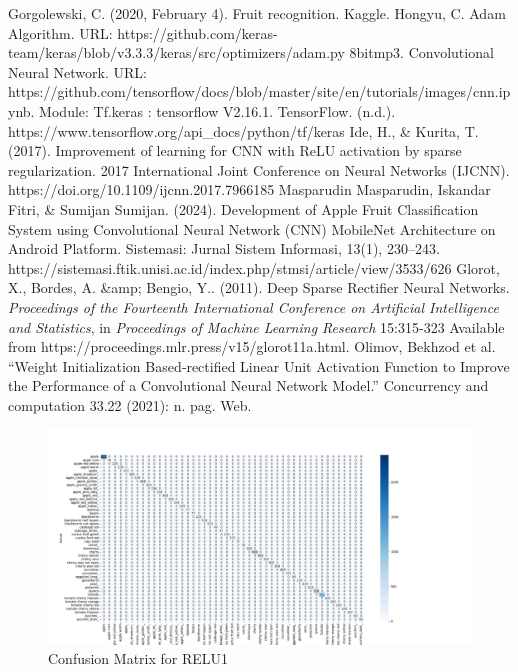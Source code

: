 \documentclass[conference]{IEEEtran}
\begin{document}
\begin{thebibliography}{00}

 Gorgolewski, C. (2020, February 4). Fruit recognition. Kaggle.
 Hongyu, C. Adam Algorithm. URL: https://github.com/keras-team/keras/blob/v3.3.3/keras/src/optimizers/adam.py
 8bitmp3. Convolutional Neural Network. URL: https://github.com/tensorflow/docs/blob/master/site/en/tutorials/images/cnn.ipynb.
 Module: Tf.keras  :  tensorflow V2.16.1. TensorFlow. (n.d.). https://www.tensorflow.org/api\_docs/python/tf/keras
 Ide, H., \& Kurita, T. (2017). Improvement of learning for CNN with ReLU activation by sparse regularization. 2017 International Joint Conference on Neural Networks (IJCNN). https://doi.org/10.1109/ijcnn.2017.7966185
 Masparudin Masparudin, Iskandar Fitri, \& Sumijan Sumijan. (2024). Development of Apple Fruit Classification System using Convolutional Neural Network (CNN) MobileNet Architecture on Android Platform. Sistemasi: Jurnal Sistem Informasi, 13(1), 230–243. https://sistemasi.ftik.unisi.ac.id/index.php/stmsi/article/view/3533/626
 Glorot, X., Bordes, A. \&amp; Bengio, Y.. (2011). Deep Sparse Rectifier Neural Networks. \textit{Proceedings of the Fourteenth International Conference on Artificial Intelligence and Statistics}, in \textit{Proceedings of Machine Learning Research} 15:315-323 Available from https://proceedings.mlr.press/v15/glorot11a.html.
 Olimov, Bekhzod et al. “Weight Initialization Based‐rectified Linear Unit Activation Function to Improve the Performance of a Convolutional Neural Network Model.” Concurrency and computation 33.22 (2021): n. pag. Web.


\end{thebibliography}
\clearpage
\onecolumn
\begin{figure}[h!]
    \centering
    \includegraphics[width=\linewidth]{relu1}
    \caption{Confusion Matrix for RELU1}
\end{figure}
\end{document}
